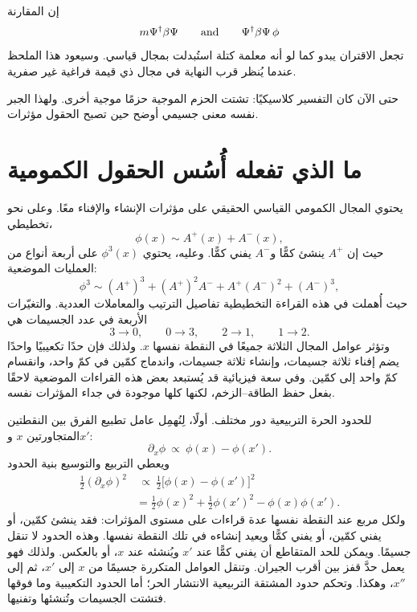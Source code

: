 إن المقارنة
\begin{equation}
m\Psi^\dagger\beta\Psi
\qquad\hbox{and}\qquad
\Psi^\dagger\beta\Psi\,\phi
\end{equation}
تجعل الاقتران يبدو كما لو أنه معلمة كتلة استُبدلت بمجال قياسي. وسيعود هذا الملحظ عندما يُنظر قرب النهاية في مجال ذي قيمة فراغية غير صفرية.

حتى الآن كان التفسير كلاسيكيًا: تشتت الحزم الموجية حزمًا موجية أخرى. ولهذا الجبر نفسه معنى جسيمي أوضح حين تصبح الحقول مؤثرات.

\section{ما الذي تفعله أُسُس الحقول الكمومية}

يحتوي المجال الكمومي القياسي الحقيقي على مؤثرات الإنشاء والإفناء معًا. وعلى نحو تخطيطي،
\begin{equation}
\phi(x)\sim A^+(x)+A^-(x),
\end{equation}
حيث إن \(A^+\) ينشئ كمًّا و\(A^-\) يفني كمًّا. وعليه، يحتوي \(\phi^3(x)\) على أربعة أنواع من العمليات الموضعية:
\begin{equation}
\phi^3
\sim
(A^+)^3+(A^+)^2A^-+A^+(A^-)^2+(A^-)^3,
\end{equation}
حيث أُهملت في هذه القراءة التخطيطية تفاصيل الترتيب والمعاملات العددية. والتغيّرات الأربعة في عدد الجسيمات هي
\begin{equation}
3\longrightarrow0,
\qquad
0\longrightarrow3,
\qquad
2\longrightarrow1,
\qquad
1\longrightarrow2.
\end{equation}
وتؤثر عوامل المجال الثلاثة جميعًا في النقطة نفسها \(x\). ولذلك فإن حدًا تكعيبيًا واحدًا يضم إفناء ثلاثة جسيمات، وإنشاء ثلاثة جسيمات، واندماج كمّين في كمّ واحد، وانقسام كمّ واحد إلى كمّين. وفي سعة فيزيائية قد يُستبعد بعض هذه القراءات الموضعية لاحقًا بفعل حفظ الطاقة--الزخم، لكنها كلها موجودة في جداء المؤثرات نفسه.

للحدود الحرة التربيعية دور مختلف. أولًا، لِنُهمِل عامل تطبيع الفرق بين النقطتين المتجاورتين \(x\) و\(x'\):
\begin{equation}
\partial_x\phi
\ \propto\
\phi(x)-\phi(x').
\end{equation}
ويعطي التربيع والتوسيع بنية الحدود
\begin{align}
\frac12(\partial_x\phi)^2
&\ \propto\
\frac12\bigl[\phi(x)-\phi(x')\bigr]^2
\\
&=
\frac12\phi(x)^2
+\frac12\phi(x')^2
-\phi(x)\phi(x').
\end{align}
ولكل مربع عند النقطة نفسها عدة قراءات على مستوى المؤثرات: فقد ينشئ كمّين، أو يفني كمّين، أو يفني كمًّا ويعيد إنشاءه في تلك النقطة نفسها. وهذه الحدود لا تنقل جسيمًا. ويمكن للحد المتقاطع أن يفني كمًّا عند \(x'\) ويُنشئه عند \(x\)، أو بالعكس. ولذلك فهو يعمل حدَّ قفز بين أقرب الجيران. وتنقل العوامل المتكررة جسيمًا من \(x\) إلى \(x'\)، ثم إلى \(x''\)، وهكذا. وتحكم حدود المشتقة التربيعية الانتشار الحر؛ أما الحدود التكعيبية وما فوقها فتشتت الجسيمات وتُنشئها وتفنيها.


